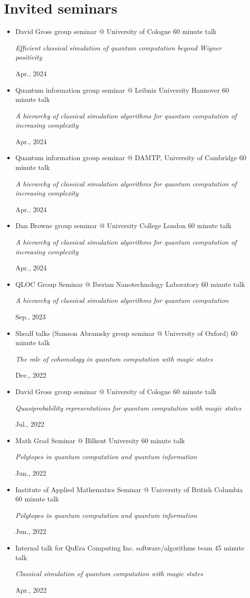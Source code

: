 \documentclass[letterpaper,11pt]{article}
\newcommand{\ConferenceItem}[4]{
	\item{\parbox{0.97\textwidth}{
		{#1} \hfill {#2}\\
		\parbox{0.86\textwidth}{\emph{#3}} \hfill {#4}
	}}
}
\begin{document}
\section*{Invited seminars}
\begin{itemize}[leftmargin=*]
	\ConferenceItem{David Gross group seminar @ University of Cologne}{60 minute talk}{Efficient classical simulation of quantum computation beyond Wigner positivity}{Apr., 2024}
	
	\ConferenceItem{Quantum information group seminar @ Leibniz University Hannover}{60 minute talk}{A hierarchy of classical simulation algorithms for quantum computation of increasing complexity}{Apr., 2024}
	
	\ConferenceItem{Quantum information group seminar @ DAMTP, University of Cambridge}{60 minute talk}{A hierarchy of classical simulation algorithms for quantum computation of increasing complexity}{Apr., 2024}
	
	\ConferenceItem{Dan Browne group seminar @ University College London}{60 minute talk}{A hierarchy of classical simulation algorithms for quantum computation of increasing complexity}{Apr., 2024}
	
	\ConferenceItem{QLOC Group Seminar @ Iberian Nanotechnology Laboratory}{60 minute talk}{A hierarchy of classical simulation algorithms for quantum computation}{Sep., 2023}
	
	\ConferenceItem{Shealf talks (Samson Abramsky group seminar @ University of Oxford)}{60 minute talk}{The role of cohomology in quantum computation with magic states}{Dec., 2022}
	
	\ConferenceItem{David Gross group seminar @ University of Cologne}{60 minute talk}{Quasiprobability representations for quantum computation with magic states}{Jul., 2022}
	
	\ConferenceItem{Math Grad Seminar @ Bilkent University}{60 minute talk}{Polytopes in quantum computation and quantum information}{Jun., 2022}
	
	\ConferenceItem{Institute of Applied Mathematics Seminar @ University of British Columbia}{60 minute talk}{Polytopes in quantum computation and quantum information}{Jun., 2022}
	
	\ConferenceItem{Internal talk for QuEra Computing Inc. software/algorithms team}{45 minute talk}{Classical simulation of quantum computation with magic states}{Apr., 2022}
\end{itemize}
\end{document}
